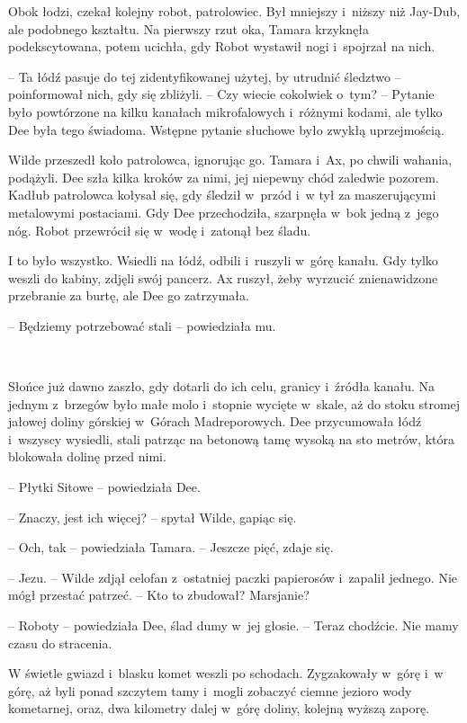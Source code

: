\documentclass[oneside,polish,11pt,sfheadings]{mwbk}
\begin{document}
Obok łodzi, czekał kolejny robot, patrolowiec. Był mniejszy i~niższy niż
Jay-Dub, ale podobnego kształtu. Na pierwszy rzut oka, Tamara krzyknęła
podekscytowana, potem ucichła, gdy Robot wystawił nogi i~spojrzał na
nich.

-- Ta łódź pasuje do tej zidentyfikowanej użytej, by utrudnić śledztwo -- poinformował nich, gdy się zbliżyli. -- Czy wiecie cokolwiek o~tym? -- Pytanie było powtórzone na kilku kanałach mikrofalowych i~różnymi
kodami, ale tylko Dee była tego świadoma. Wstępne pytanie słuchowe było
zwykłą uprzejmością.

Wilde przeszedł koło patrolowca, ignorując go. Tamara i~Ax, po chwili
wahania, podążyli. Dee szła kilka kroków za nimi, jej niepewny chód
zaledwie pozorem. Kadłub patrolowca kołysał się, gdy śledził w~przód i~w tył za maszerującymi metalowymi postaciami. Gdy Dee przechodziła,
szarpnęła w~bok jedną z~jego nóg. Robot przewrócił się w~wodę i~zatonął
bez śladu.

I to było wszystko. Wsiedli na łódź, odbili i~ruszyli w~górę kanału. Gdy
tylko weszli do kabiny, zdjęli swój pancerz. Ax ruszył, żeby wyrzucić
znienawidzone przebranie za burtę, ale Dee go zatrzymała.

-- Będziemy potrzebować stali -- powiedziała mu.

~

Słońce już dawno zaszło, gdy dotarli do ich celu, granicy i~źródła
kanału. Na jednym z~brzegów było małe molo i~stopnie wycięte w~skale, aż
do stoku stromej jałowej doliny górskiej w~Górach Madreporowych. Dee
przycumowała łódź i~wszyscy wysiedli, stali patrząc na betonową tamę
wysoką na sto metrów, która blokowała dolinę przed nimi.

-- Płytki Sitowe -- powiedziała Dee.

-- Znaczy, jest ich więcej? -- spytał Wilde, gapiąc się.

-- Och, tak -- powiedziała Tamara. -- Jeszcze pięć, zdaje się.

-- Jezu. -- Wilde zdjął celofan z~ostatniej paczki papierosów i~zapalił
jednego. Nie mógł przestać patrzeć. -- Kto to zbudował? Marsjanie?

-- Roboty -- powiedziała Dee, ślad dumy w~jej głosie. -- Teraz chodźcie.
Nie mamy czasu do stracenia.

W świetle gwiazd i~blasku komet weszli po schodach. Zygzakowały w~górę i~w górę, aż byli ponad szczytem tamy i~mogli zobaczyć ciemne jezioro wody
kometarnej, oraz, dwa kilometry dalej w~górę doliny, kolejną wyższą
zaporę.
\end{document}
